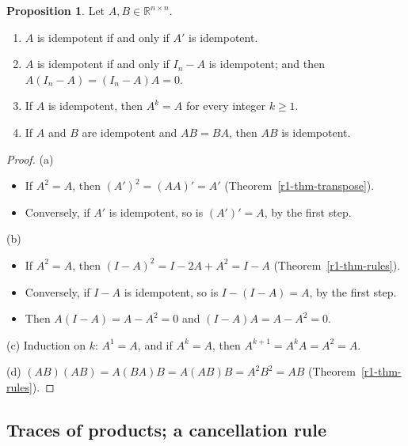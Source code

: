 \documentclass[12pt]{article}
\newcommand{\R}{\mathbb R}
\theoremstyle{definition}
\newtheorem{proposition}[theorem]{Proposition}
\begin{document}
\begin{proposition}\label{r1-prop-idempotent}
Let \(A,B\in\R^{n\times n}\).
\begin{enumerate}
\item \(A\) is idempotent if and only if \(A'\) is idempotent.
\item \(A\) is idempotent if and only if \(I_n-A\) is idempotent; and then \(A(I_n-A)=(I_n-A)A=0\).
\item If \(A\) is idempotent, then \(A^k=A\) for every integer \(k\geqslant1\).
\item If \(A\) and \(B\) are idempotent and \(AB=BA\), then \(AB\) is idempotent.
\end{enumerate}
\end{proposition}
\begin{proof}
(a)
\begin{itemize}
\item If \(A^2=A\), then \((A')^2=(AA)'=A'\) (Theorem~\ref{r1-thm-transpose}).
\item Conversely, if \(A'\) is idempotent, so is \((A')'=A\), by the first step.
\end{itemize}
(b)
\begin{itemize}
\item If \(A^2=A\), then \((I-A)^2=I-2A+A^2=I-A\) (Theorem~\ref{r1-thm-rules}).
\item Conversely, if \(I-A\) is idempotent, so is \(I-(I-A)=A\), by the first step.
\item Then \(A(I-A)=A-A^2=0\) and \((I-A)A=A-A^2=0\).
\end{itemize}
(c) Induction on \(k\): \(A^1=A\), and if \(A^k=A\), then \(A^{k+1}=A^kA=A^2=A\).

(d) \((AB)(AB)=A(BA)B=A(AB)B=A^2B^2=AB\) (Theorem~\ref{r1-thm-rules}).
\end{proof}

\subsection*{Traces of products; a cancellation rule}
\end{document}
